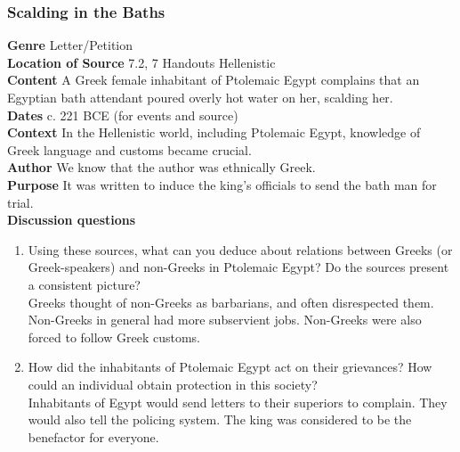 \documentclass{article}
\begin{document}
\subsubsection*{Scalding in the Baths}
\textbf{Genre}
Letter/Petition \\
\textbf{Location of Source}
7.2, 7 Handouts Hellenistic \\
\textbf{Content}
A Greek female inhabitant of Ptolemaic Egypt complains that an Egyptian bath attendant
poured overly hot water on her, scalding her. \\
\textbf{Dates}
c. 221 BCE (for events and source) \\
\textbf{Context}
In the Hellenistic world, including Ptolemaic Egypt, knowledge of Greek language and
customs became crucial. \\
\textbf{Author}
We know that the author was ethnically Greek. \\
\textbf{Purpose}
It was written to induce the king’s officials to send the bath man for trial. \\
\textbf{Discussion questions}
\begin{enumerate}
  \item Using these sources, what can you deduce about relations between Greeks (or
  Greek-speakers) and non-Greeks in Ptolemaic Egypt? Do the sources present a consistent picture? \\
  Greeks thought of non-Greeks as barbarians, and often disrespected them. Non-Greeks in
  general had more subservient jobs. Non-Greeks were also forced to follow Greek customs.
  \item How did the inhabitants of Ptolemaic Egypt act on their grievances? How could an
  individual obtain protection in this society? \\
  Inhabitants of Egypt would send letters to their superiors to complain. They would also tell
  the policing system. The king was considered to be the benefactor for everyone.
\end{enumerate}
\end{document}
